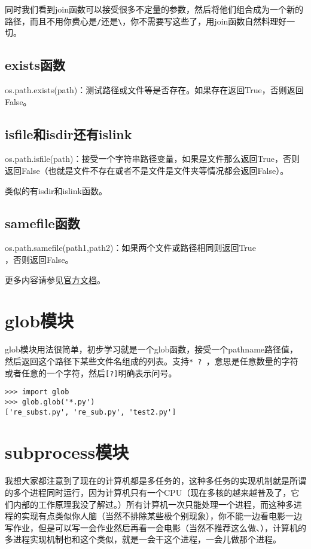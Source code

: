 \documentclass[12pt,oneside]{book}
\begin{document}
\begin{common-format}
同时我们看到join函数可以接受很多不定量的参数，然后将他们组合成为一个新的路径，而且不用你费心是\verb+/+还是\verb+\+，你不需要写这些了，用join函数自然料理好一切。



\section{exists函数}
os.path.exists(path)：测试路径或文件等是否存在。如果存在返回True，否则返回False。

\section{isfile和isdir还有islink}
os.path.isfile(path)：接受一个字符串路径变量，如果是文件那么返回True，否则返回False（也就是文件不存在或者不是文件是文件夹等情况都会返回False）。

类似的有isdir和islink函数。


\section{samefile函数}
os.path.samefile(path1,path2)：如果两个文件或路径相同则返回True\\，否则返回False。



\begin{large}
更多内容请参见\href{https://docs.python.org/3/library/os.path.html}{官方文档}。
\end{large}


\chapter{glob模块}
glob模块用法很简单，初步学习就是一个glob函数，接受一个pathname路径值，然后返回这个路径下某些文件名组成的列表。支持\verb+* ? +，意思是任意数量的字符或者任意的一个字符，然后\verb+[?]+明确表示问号。
\begin{Verbatim}
>>> import glob
>>> glob.glob('*.py')
['re_subst.py', 're_sub.py', 'test2.py']
\end{Verbatim}




\chapter{subprocess模块}
我想大家都注意到了现在的计算机都是多任务的，这种多任务的实现机制就是所谓的多个进程同时运行，因为计算机只有一个CPU（现在多核的越来越普及了，它们内部的工作原理我没了解过。）所有计算机一次只能处理一个进程，而这种多进程的实现有点类似你人脑（当然不排除某些极个别现象），你不能一边看电影一边写作业，但是可以写一会作业然后再看一会电影（当然不推荐这么做、），计算机的多进程实现机制也和这个类似，就是一会干这个进程，一会儿做那个进程。


\end{common-format}
\end{document}
